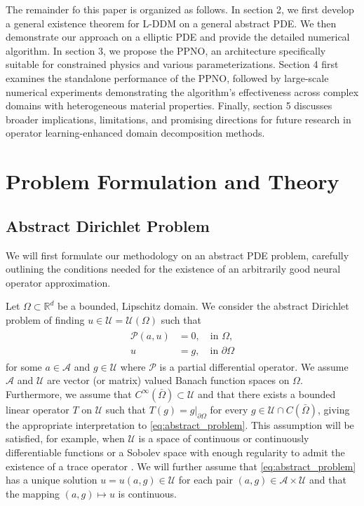 \documentclass[preprint,11pt]{elsarticle}
\theoremstyle{plain}
\newcommand{\A}{\mathcal{A}}
\newcommand{\U}{\mathcal{U}}
\begin{document}
The remainder fo this paper is organized as follows. In section 2, we first develop a general existence theorem for L-DDM on a general abstract PDE. We then demonstrate our approach on a elliptic PDE and provide the detailed numerical algorithm. In section 3, we propose the PPNO, an architecture specifically suitable for constrained physics and various parameterizations. Section 4 first examines the standalone performance of the PPNO, followed by large-scale numerical experiments demonstrating the algorithm's effectiveness across complex domains with heterogeneous material properties. Finally, section 5 discusses broader implications, limitations, and promising directions for future research in operator learning-enhanced domain decomposition methods.

\section{Problem Formulation and Theory}
\subsection{Abstract Dirichlet Problem}
We will first formulate our methodology on an abstract PDE problem, carefully outlining the conditions needed for the existence of an arbitrarily good neural operator approximation.

Let $\Omega \subset \mathbb{R}^d$ be a bounded, Lipschitz domain. We consider the abstract  Dirichlet problem of finding $u \in \U = \U (\Omega)$ such that
\begin{align}
\label{eq:abstract_problem}
    \begin{split}
    \mathcal{P}(a,u) &= 0, \quad \text{in } \Omega, \\
    u&= g, \quad \text{in } \partial \Omega
    \end{split}
\end{align}
for some $a \in \A$ and $g \in \U$ where $\mathcal{P}$ is a partial differential operator. We assume $\A$ and $\U$ are vector (or matrix) valued Banach function spaces on $\Omega$. Furthermore, we assume that $C^\infty (\bar{\Omega}) \subset \U$ and that there exists a bounded linear operator $T$ on $\U$ such that $T(g) = g|_{\partial \Omega}$ for every $g \in \U \cap C(\bar{\Omega})$, giving the appropriate interpretation to \eqref{eq:abstract_problem}. This assumption will be satisfied, for example, when $\U$ is a space of continuous or continuously differentiable functions or a Sobolev space with enough regularity to admit the existence of a trace operator \cite{adams2003sobolev}. We will further assume that \eqref{eq:abstract_problem} has a unique solution $u = u(a,g) \in \U$ for each pair $(a,g) \in \A \times \U$ and that the mapping $(a,g) \mapsto u$ is continuous. 
\end{document}
